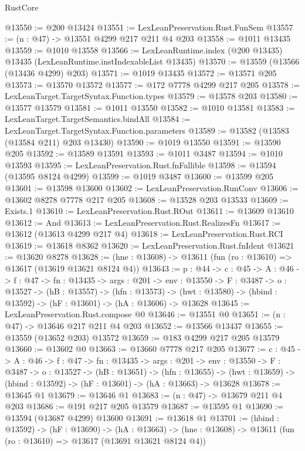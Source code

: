 \begin{lexlean}{RustCore}
\begin{coremodule}
@13550 := @200 @13424
@13551 := LexLeanPreservation.Rust.FunSem
@13557 := (n : @47) -> @13551 @4299 @217 @211 @4 @203
@13558 := @1011 @13435
@13559 := @1010 @13558
@13566 := LexLeanRuntime.index (@200 @13435) @13435 (LexLeanRuntime.instIndexableList @13435)
@13570 := @13559 (@13566 (@13436 @4299) @203)
@13571 := @1019 @13435
@13572 := @13571 @205
@13573 := @13570 @13572
@13577 := @172 @7778 @4299 @217 @205
@13578 := LexLeanTarget.TargetSyntax.Function.types
@13579 := @13578 @203
@13580 := @13577 @13579
@13581 := @1011 @13550
@13582 := @1010 @13581
@13583 := LexLeanTarget.TargetSemantics.bindAll
@13584 := LexLeanTarget.TargetSyntax.Function.parameters
@13589 := @13582 (@13583 (@13584 @211) @203 @13430)
@13590 := @1019 @13550
@13591 := @13590 @205
@13592 := @13589 @13591
@13593 := @1011 @3487
@13594 := @1010 @13593
@13595 := LexLeanPreservation.Rust.fnFallible
@13598 := @13594 (@13595 @8124 @4299)
@13599 := @1019 @3487
@13600 := @13599 @205
@13601 := @13598 @13600
@13602 := LexLeanPreservation.RunConv
@13606 := @13602 @8278 @7778 @217 @205
@13608 := @13528 @203 @13533
@13609 := Exists.{1}
@13610 := LexLeanPreservation.Rust.ROut
@13611 := @13609 @13610
@13612 := And
@13613 := LexLeanPreservation.Rust.RealizesFn
@13617 := @13612 (@13613 @4299 @217 @4)
@13618 := LexLeanPreservation.Rust.RCI
@13619 := @13618 @8362
@13620 := LexLeanPreservation.Rust.fnIdent
@13621 := @13620 @8278
@13628 := (hne : @13608) -> @13611 (fun (ro : @13610) => @13617 (@13619 @13621 @8124 @4))
@13643 := {p : @44} ->
  {c : @45} ->
  {A : @46} ->
  {f : @47} ->
  {fn : @13435} ->
  {args : @201} ->
  {env : @13550} ->
  {F : @3487} ->
  {o : @13527} ->
  (hB : @13557) ->
  (hfn : @13573) -> (hwt : @13580) -> (hbind : @13592) -> (hF : @13601) -> (hA : @13606) -> @13628
@13645 := LexLeanPreservation.Rust.compose @0
@13646 := @13551 @0
@13651 := (n : @47) -> @13646 @217 @211 @4 @203
@13652 := @13566 @13437
@13655 := @13559 (@13652 @203) @13572
@13659 := @183 @4299 @217 @205 @13579
@13660 := @13602 @0
@13663 := @13660 @7778 @217 @205
@13677 := {c : @45} ->
  {A : @46} ->
  {f : @47} ->
  {fn : @13435} ->
  {args : @201} ->
  {env : @13550} ->
  {F : @3487} ->
  {o : @13527} ->
  (hB : @13651) ->
  (hfn : @13655) -> (hwt : @13659) -> (hbind : @13592) -> (hF : @13601) -> (hA : @13663) -> @13628
@13678 := @13645 @1
@13679 := @13646 @1
@13683 := (n : @47) -> @13679 @211 @4 @203
@13686 := @191 @217 @205 @13579
@13687 := @13595 @1
@13690 := @13594 (@13687 @4299) @13600
@13691 := @13618 @1
@13701 := (hbind : @13592) ->
  (hF : @13690) ->
  (hA : @13663) -> (hne : @13608) -> @13611 (fun (ro : @13610) => @13617 (@13691 @13621 @8124 @4))

\end{coremodule}
\end{lexlean}

